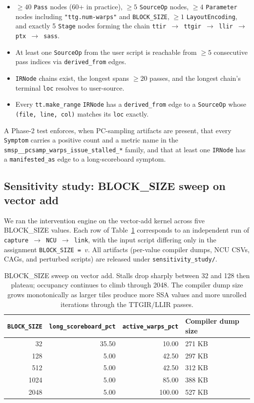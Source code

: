 \documentclass[10pt]{article}
\begin{document}
\begin{itemize}[leftmargin=*,itemsep=0.1em,topsep=0.2em]
  \item $\geq 40$ \texttt{Pass} nodes (60+ in practice), $\geq 5$ \texttt{SourceOp} nodes, $\geq 4$ \texttt{Parameter} nodes including \texttt{"ttg.num-warps"} and \texttt{BLOCK\_SIZE}, $\geq 1$ \texttt{LayoutEncoding}, and exactly 5 \texttt{Stage} nodes forming the chain \texttt{ttir $\to$ ttgir $\to$ llir $\to$ ptx $\to$ sass}.
  \item At least one \texttt{SourceOp} from the user script is reachable from $\geq 5$ consecutive pass indices via \texttt{derived\_from} edges.
  \item \texttt{IRNode} chains exist, the longest spans $\geq 20$ passes, and the longest chain's terminal \texttt{loc} resolves to user-source.
  \item Every \texttt{tt.make\_range} \texttt{IRNode} has a \texttt{derived\_from} edge to a \texttt{SourceOp} whose \texttt{(file, line, col)} matches its \texttt{loc} exactly.
\end{itemize}

A Phase-2 test enforces, when PC-sampling artifacts are present, that every \texttt{Symptom} carries a positive count and a metric name in the \texttt{smsp\_\_pcsamp\_warps\_issue\_stalled\_*} family, and that at least one \texttt{IRNode} has a \texttt{manifested\_as} edge to a long-scoreboard symptom.

\subsection{Sensitivity study: BLOCK\_SIZE sweep on vector add}\label{sec:sweep}

We ran the intervention engine on the vector-add kernel across five BLOCK\_SIZE values. Each row of Table~\ref{tab:sweep} corresponds to an independent run of \texttt{capture $\to$ NCU $\to$ link}, with the input script differing only in the assignment \texttt{BLOCK\_SIZE = $v$}. All artifacts (per-value compiler dumps, NCU CSVs, CAGs, and perturbed scripts) are released under \texttt{sensitivity\_study/}.

\begin{table}[h]
\centering\small
\begin{tabular}{@{}rrrl@{}}
\toprule
\texttt{BLOCK\_SIZE} & \texttt{long\_scoreboard\_pct} & \texttt{active\_warps\_pct} & Compiler dump size \\ \midrule
32   & 35.50 & 10.00  & 271 KB \\
128  &  5.00 & 42.50  & 297 KB \\
512  &  5.00 & 42.50  & 312 KB \\
1024 &  5.00 & 85.00  & 388 KB \\
2048 &  5.00 & 100.00 & 527 KB \\
\bottomrule
\end{tabular}
\caption{BLOCK\_SIZE sweep on vector add. Stalls drop sharply between 32 and 128 then plateau; occupancy continues to climb through 2048. The compiler dump size grows monotonically as larger tiles produce more SSA values and more unrolled iterations through the TTGIR/LLIR passes.}
\label{tab:sweep}
\end{table}
\end{document}
